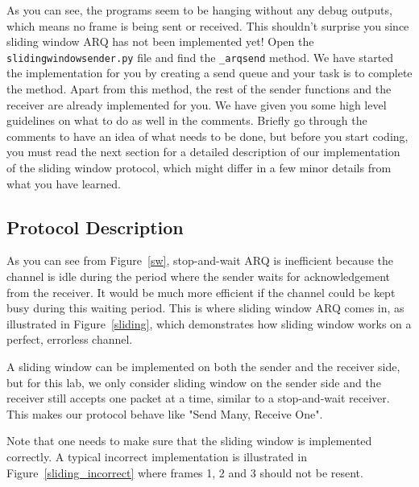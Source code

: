 \documentclass[11pt]{article}
\begin{document}
As you can see, the programs seem to be hanging without any debug outputs, which means no frame is being sent or received.
This shouldn't surprise you since sliding window ARQ has not been implemented yet!
Open the \texttt{slidingwindowsender.py} file and find the \texttt{\_arqsend} method.
We have started the implementation for you by creating a send queue and your task is to complete the method.
Apart from this method, the rest of the sender functions and the receiver are already implemented for you.
We have given you some high level guidelines on what to do as well in the comments.
Briefly go through the comments to have an idea of what needs to be done, but before you start coding, you must read the next section for a detailed description of our implementation of the sliding window protocol, which might differ in a few minor details from what you have learned.

\subsection{Protocol Description}
\label{sec:protocol}
As you can see from Figure~\ref{sw}, stop-and-wait ARQ is inefficient because the channel is idle during the period where the sender waits for acknowledgement from the receiver.
It would be much more efficient if the channel could be kept busy during this waiting period.
This is where sliding window ARQ comes in, as illustrated in Figure~\ref{sliding}, which demonstrates how sliding window works on a perfect, errorless channel.

A sliding window can be implemented on both the sender and the receiver side, but for this lab, we only consider sliding window on the sender side and the receiver still accepts one packet
at a time, similar to a stop-and-wait receiver. This makes our protocol behave like "Send Many, Receive One".

Note that one needs to make sure that the sliding window is implemented correctly.
A typical incorrect implementation is illustrated in Figure~\ref{sliding_incorrect} where frames 1, 2 and 3 should not be resent.
\end{document}

